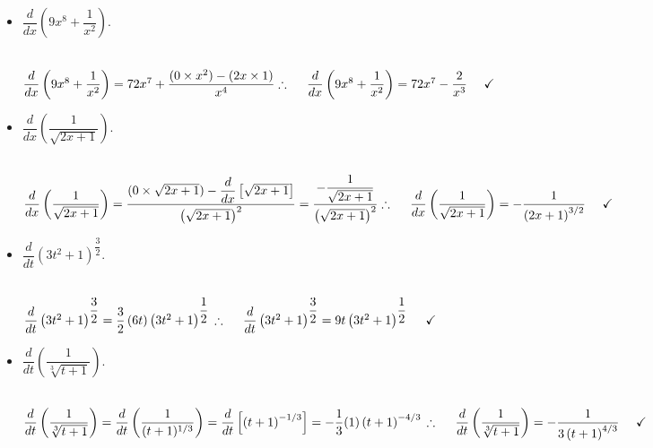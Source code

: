 \documentclass[fleqn]{article}
\begin{document}
\begin{enumerate}
\begin{itemize}
      \item $\dfrac{d}{dx} \left(9x^8+\dfrac{1}{x^2}\right)$.

        \textcolor{hwColor}{
          \\
          $
            \dfrac{d}{dx} \left(9x^8+\dfrac{1}{x^2}\right)=72x^7+\dfrac{(0 \times x^2)-(2x \times 1)}{x^4}
            \\
            \\
            \\
            \therefore ~~~~ \dfrac{d}{dx} \left(9x^8+\dfrac{1}{x^2}\right)=72x^7-\dfrac{2}{x^3} ~~~~ \checkmark
            \\
          $
        }

      \item $\dfrac{d}{dx} \left(\dfrac{1}{\sqrt{2x+1}}\right)$.

        \textcolor{hwColor}{
          \\
          $
            \dfrac{d}{dx} \left(\dfrac{1}{\sqrt{2x+1}}\right)=\dfrac{(0 \times \sqrt{2x+1})-\dfrac{d}{dx} \left[\sqrt{2x+1}\right]}{\left(\sqrt{2x+1}\right)^2}
            =\dfrac{-\dfrac{1}{\sqrt{2x+1}}}{\left(\sqrt{2x+1}\right)^2}
            \\
            \\
            \\
            \therefore ~~~~ \dfrac{d}{dx} \left(\dfrac{1}{\sqrt{2x+1}}\right)=-\dfrac{1}{\left(2x+1\right)^{3/2}} ~~~~ \checkmark
            \\
          $
        }

      \item $\dfrac{d}{dt} \left(3t^2+1\right)^{\dfrac{3}{2}}$.

        \textcolor{hwColor}{
          \\
          $
            \dfrac{d}{dt} \left(3t^2+1\right)^{\dfrac{3}{2}}=\dfrac{3}{2} \left(6t\right) \left(3t^2+1\right)^{\dfrac{1}{2}}
            \\
            \\
            \\
            \therefore ~~~~ \dfrac{d}{dt} \left(3t^2+1\right)^{\dfrac{3}{2}}=9t \left(3t^2+1\right)^{\dfrac{1}{2}} ~~~~ \checkmark
            \\
          $
        }

      \item $\dfrac{d}{dt} \left(\dfrac{1}{\sqrt[3]{t+1}}\right)$.

        \textcolor{hwColor}{
          \\
          $
            \dfrac{d}{dt} \left(\dfrac{1}{\sqrt[3]{t+1}}\right)
            =\dfrac{d}{dt} \left(\dfrac{1}{(t+1)^{1/3}}\right)
            =\dfrac{d}{dt} \left[\left(t+1\right)^{-1/3}\right]
            =-\dfrac{1}{3} (1) \left(t+1\right)^{-4/3}
            \\
            \\
            \\
            \therefore ~~~~ \dfrac{d}{dt} \left(\dfrac{1}{\sqrt[3]{t+1}}\right)=-\dfrac{1}{3\left(t+1\right)^{4/3}} ~~~~ \checkmark
            \\
          $
        }


\end{itemize}
\end{enumerate}
\end{document}
